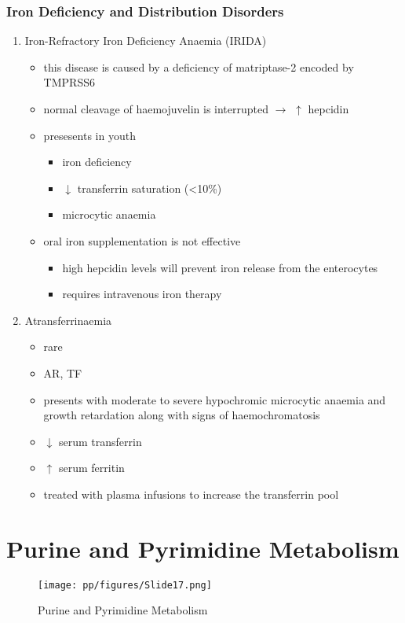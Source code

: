 \documentclass[12pt]{scrartcl}
\begin{document}
\subsubsection{Iron Deficiency and Distribution Disorders}
\label{sec:orgc2b047d}
\begin{enumerate}
\item Iron-Refractory Iron Deficiency Anaemia (IRIDA)
\label{sec:orgad13dd2}
\begin{itemize}
\item this disease is caused by a deficiency of matriptase-2 encoded by TMPRSS6
\item normal cleavage of haemojuvelin is interrupted \(\to\) \(\uparrow\) hepcidin
\item presesents in youth
\begin{itemize}
\item iron deficiency
\item \(\downarrow\) transferrin saturation (<10\%)
\item microcytic anaemia
\end{itemize}
\item oral iron supplementation is not effective
\begin{itemize}
\item high hepcidin levels will prevent iron release from the
enterocytes
\item requires intravenous iron therapy
\end{itemize}
\end{itemize}

\item Atransferrinaemia
\label{sec:org9b59224}
\begin{itemize}
\item rare
\item AR, TF
\item presents with moderate to severe hypochromic microcytic anaemia and
growth retardation along with signs of haemochromatosis
\item \(\downarrow\) serum transferrin
\item \(\uparrow\) serum ferritin
\item treated with plasma infusions to increase the transferrin pool
\end{itemize}
\end{enumerate}
\section{Purine and Pyrimidine Metabolism}
\label{sec:org4988dbf}
\begin{figure}[htbp]
\centering
\texttt{[image: pp/figures/Slide17.png]}
\caption{\label{fig:org71a3344}Purine and Pyrimidine Metabolism}
\end{figure}
\end{document}
